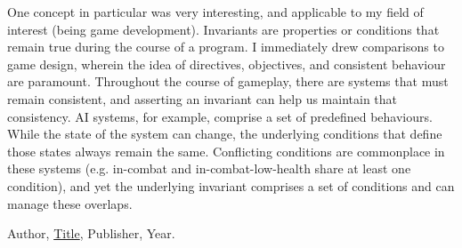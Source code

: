 \documentclass{article}
\theoremstyle{theorem}
\theoremstyle{definition}
\theoremstyle{remark}
\begin{document}
One concept in particular was very interesting, and applicable to my field of interest (being game development). Invariants are properties or conditions that remain true during the course of a program. I immediately drew comparisons to game design, wherein the idea of directives, objectives, and consistent behaviour are paramount. Throughout the course of gameplay, there are systems that must remain consistent, and asserting an invariant can help us maintain that consistency. AI systems, for example, comprise a set of predefined behaviours. While the state of the system can change, the underlying conditions that define those states always remain the same. Conflicting conditions are commonplace in these systems (e.g. in-combat and in-combat-low-health share at least one condition), and yet the underlying invariant comprises a set of conditions and can manage these overlaps.


\begin{thebibliography}{99}
 Author, \href{https://en.wikipedia.org/wiki/LaTeX}{Title}, Publisher, Year.
\end{thebibliography}
\end{document}
